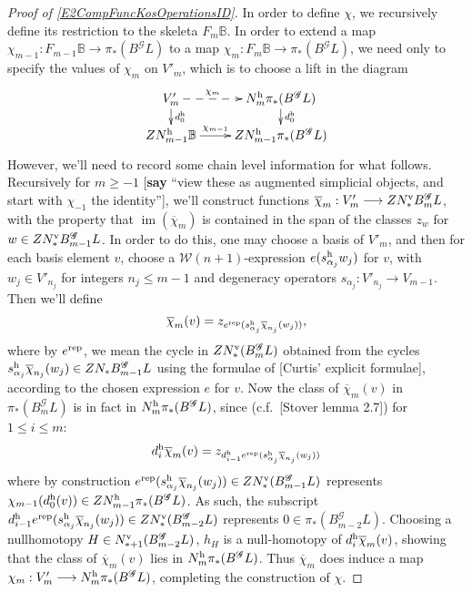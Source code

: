 \documentclass[11pt]{amsart}
\theoremstyle{plain}
\theoremstyle{definition}
\DeclareMathOperator{\im}{im}
\renewcommand{\to}{\longrightarrow}
\newcommand{\scrG}{\mathscr{G}}
\newcommand{\calW}{\mathcal{W}}
\theoremstyle{plain}
\newcommand{\BSW}{{\scrG}}
\newcommand{\BSWres}{B^\BSW}%
\begin{document}
\begin{Composite functor spectral sequences}
\begin{tricky proofs of operation compatibilities}
\begin{proof}[Proof of \ref{E2CompFuncKosOperationsID}]
In order to define $\chi$, we recursively define its restriction to the skeleta $F_m\mathbb{B}$. In order to extend a map $\chi_{m-1}:F_{m-1}\mathbb{B}\to \pi_*(\BSWres L)$ to a map $\chi_m:F_m\mathbb{B}\to \pi_*(\BSWres L)$, we need only to specify the values of $\chi_m$ on $V'_m$, which is to choose a lift in the diagram
\[\xymatrix@R=4mm{
V'_m\ar@{-->}[r]^-{\chi_m}
\ar[d]^-{d_0^\textup{h}}
&%
N^\textup{h}_m\pi_*(\BSWres L)\ar[d]^-{d_0^\textup{h}}
\\%
ZN^\textup{h}_{m-1}\mathbb{B}\ar[r]^-{\chi_{m-1}}
&%
ZN^\textup{h}_{m-1}\pi_*(\BSWres L)%
}\]
However, we'll need to record some chain level information for what follows. Recursively for $m\geq-1$ [\textbf{say} ``view these as augmented simplicial objects, and start with $\chi_{-1}$ the identity''], we'll construct functions $\overline{\chi}_m:V'_m\to ZN^\textup{v}_*\BSWres_m L$, with the property that $\im(\overline{\chi}_m)$ is contained in the span of the classes $z_{w}$ for $w\in ZN^\textup{v}_*\BSWres_{m-1}L$. In order to do this, one may choose a basis of $V'_m$, and then for each basis element $v$, choose a $\calW(n+1)$-expression $e(s^\textup{h}_{\alpha_j}w_j)$ for $v$, with $w_j\in V'_{n_j}$ for integers $n_j\leq m-1$ and degeneracy operators $s_{\alpha_j}:V'_{n_j}\to V_{m-1}$. Then we'll define
\[\overline{\chi}_m(v)=z_{e^\textup{rep}(s^\textup{h}_{\alpha_j}\overline{\chi}_{n_j}(w_j))},\]
where by $e^\textup{rep}$, we mean the cycle in $ZN_*^\textup{v}(\BSWres_mL)$ obtained from the cycles $s^\textup{h}_{\alpha_j}\overline{\chi}_{n_j}(w_j)\in ZN_*\BSWres_{m-1}L$ using the formulae of [Curtis' explicit formulae], according to the chosen expression $e$ for $v$.
Now the class of $\overline{\chi}_m(v)$ in $\pi_*(\BSWres_mL)$ is in fact in $N^\textup{h}_m\pi_*(\BSWres L)$, since (c.f.\ [Stover lemma 2.7]) for $1\leq i \leq m$:
\[d_i^\textup{h}\overline{\chi}_m(v) =z_{d^\textup{h}_{i-1}e^\textup{rep}(s^\textup{h}_{\alpha_j}\overline{\chi}_{n_j}(w_j))}\]
where by construction $e^\textup{rep}(s^\textup{h}_{\alpha_j}\overline{\chi}_{n_j}(w_j))\in ZN^\textup{v}_*(\BSWres_{m-1} L)$ represents $\chi_{m-1}(d_{0}^\textup{h}(v))\in ZN_{m-1}^\textup{h}\pi_*(\BSWres  L)$. As such, the subscript $d^\textup{h}_{i-1}e^\textup{rep}(s^\textup{h}_{\alpha_j}\overline{\chi}_{n_j}(w_j))\in ZN^\textup{v}_*(\BSWres_{m-2} L)$ represents $0\in\pi_*(\BSWres_{m-2}L)$. Choosing a nullhomotopy $H\in N^\textup{v}_{*+1}(\BSWres_{m-2}L)$, $h_H$ is a null-homotopy of $d_i^\textup{h}\overline{\chi}_m(v)$, showing that the class of  $\overline{\chi}_m(v)$ lies in $N^\textup{h}_m\pi_*(\BSWres L)$.
Thus $\overline{\chi}_m$ does induce a map $\chi_m:V'_m\to N_m^\textup{h}\pi_*(\BSWres L)$, completing the construction of $\chi$.







\end{proof}
\end{tricky proofs of operation compatibilities}
\end{Composite functor spectral sequences}
\end{document}

